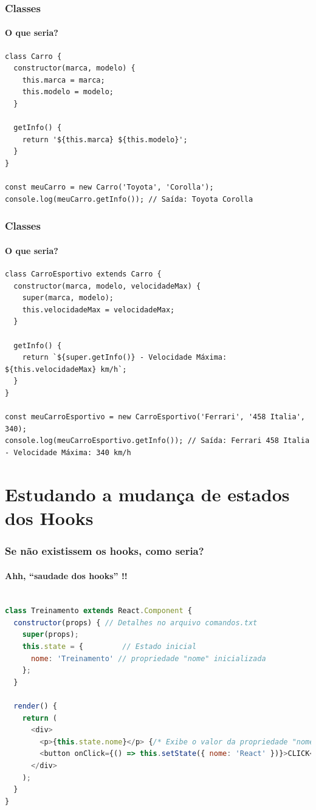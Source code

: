 \documentclass[13pt, xcolor={dvipsnames,svgnames}, portuguese]{beamer}
\begin{document}
\begin{frame}[fragile]
\frametitle{Classes}
\framesubtitle{O que seria?}

\begin{verbatim}
class Carro {
  constructor(marca, modelo) {
    this.marca = marca;
    this.modelo = modelo;
  }

  getInfo() {
    return '${this.marca} ${this.modelo}';
  }
}

const meuCarro = new Carro('Toyota', 'Corolla');
console.log(meuCarro.getInfo()); // Saída: Toyota Corolla

\end{verbatim}


\end{frame}
\begin{frame}[fragile]
\frametitle{Classes}
\framesubtitle{O que seria?}

\begin{verbatim}
class CarroEsportivo extends Carro {
  constructor(marca, modelo, velocidadeMax) {
    super(marca, modelo);
    this.velocidadeMax = velocidadeMax;
  }

  getInfo() {
    return `${super.getInfo()} - Velocidade Máxima: ${this.velocidadeMax} km/h`;
  }
}

const meuCarroEsportivo = new CarroEsportivo('Ferrari', '458 Italia', 340);
console.log(meuCarroEsportivo.getInfo()); // Saída: Ferrari 458 Italia - Velocidade Máxima: 340 km/h

\end{verbatim}

\end{frame}

\section{Estudando a mudança de estados dos Hooks}

\begin{frame}[fragile]
\frametitle{Se não existissem os hooks, como seria?}
\framesubtitle{Ahh, ``saudade dos hooks'' !!}
\begin{lstlisting}[language=JavaScript]

class Treinamento extends React.Component {
  constructor(props) { // Detalhes no arquivo comandos.txt
    super(props);
    this.state = {         // Estado inicial
      nome: 'Treinamento' // propriedade "nome" inicializada 
    };
  }

  render() {
    return (
      <div>
        <p>{this.state.nome}</p> {/* Exibe o valor da propriedade "nome" do estado */}
        <button onClick={() => this.setState({ nome: 'React' })}>CLICK</button>
      </div>
    );
  }
}
\end{lstlisting}

\end{frame}
\end{document}
